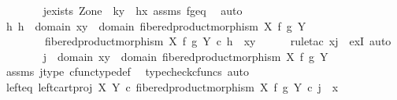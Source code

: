 \begin{isabellebody}
\ \ \ \ \ \ \isamarkupfalse%
\ j{\isacharunderscore}{\kern0pt}exists{\isacharbrackleft}{\kern0pt}\ Z{\isacharequal}{\kern0pt}one{\isacharcomma}{\kern0pt}\ \ k{\isacharequal}{\kern0pt}y{\isacharcomma}{\kern0pt}\ \ h{\isacharequal}{\kern0pt}x{\isacharbrackright}{\kern0pt}\ assms\ f{\isacharunderscore}{\kern0pt}g{\isacharunderscore}{\kern0pt}eq\ \isamarkupfalse%
\ auto\isanewline
\ \ \ \ \isamarkupfalse%
\ {\isachardoublequoteopen}{\isasymexists}h{\isachardot}{\kern0pt}\ h\ {\isacharcolon}{\kern0pt}\ domain\ {\isasymlangle}x{\isacharcomma}{\kern0pt}y{\isasymrangle}\ {\isasymrightarrow}\ domain\ {\isacharparenleft}{\kern0pt}fibered{\isacharunderscore}{\kern0pt}product{\isacharunderscore}{\kern0pt}morphism\ X\ f\ g\ Y{\isacharparenright}{\kern0pt}\ {\isasymand}\isanewline
\ \ \ \ \ \ \ \ fibered{\isacharunderscore}{\kern0pt}product{\isacharunderscore}{\kern0pt}morphism\ X\ f\ g\ Y\ {\isasymcirc}\isactrlsub c\ h\ {\isacharequal}{\kern0pt}\ {\isasymlangle}x{\isacharcomma}{\kern0pt}y{\isasymrangle}{\isachardoublequoteclose}\isanewline
\ \ \ \ \isamarkupfalse%
\ {\isacharparenleft}{\kern0pt}rule{\isacharunderscore}{\kern0pt}tac\ x{\isacharequal}{\kern0pt}j\ \ exI{\isacharcomma}{\kern0pt}\ auto{\isacharparenright}{\kern0pt}\isanewline
\ \ \ \ \ \ \isamarkupfalse%
\ {\isachardoublequoteopen}j\ {\isacharcolon}{\kern0pt}\ domain\ {\isasymlangle}x{\isacharcomma}{\kern0pt}y{\isasymrangle}\ {\isasymrightarrow}\ domain\ {\isacharparenleft}{\kern0pt}fibered{\isacharunderscore}{\kern0pt}product{\isacharunderscore}{\kern0pt}morphism\ X\ f\ g\ Y{\isacharparenright}{\kern0pt}{\isachardoublequoteclose}\isanewline
\ \ \ \ \ \ \ \ \isamarkupfalse%
\ assms\ j{\isacharunderscore}{\kern0pt}type\ cfunc{\isacharunderscore}{\kern0pt}type{\isacharunderscore}{\kern0pt}def\ \isamarkupfalse%
\ {\isacharparenleft}{\kern0pt}typecheck{\isacharunderscore}{\kern0pt}cfuncs{\isacharcomma}{\kern0pt}\ auto{\isacharparenright}{\kern0pt}\isanewline
\isanewline
\ \ \ \ \ \ \isamarkupfalse%
\ left{\isacharunderscore}{\kern0pt}eq{\isacharcolon}{\kern0pt}\ {\isachardoublequoteopen}left{\isacharunderscore}{\kern0pt}cart{\isacharunderscore}{\kern0pt}proj\ X\ Y\ {\isasymcirc}\isactrlsub c\ fibered{\isacharunderscore}{\kern0pt}product{\isacharunderscore}{\kern0pt}morphism\ X\ f\ g\ Y\ {\isasymcirc}\isactrlsub c\ j\ {\isacharequal}{\kern0pt}\ x{\isachardoublequoteclose}\isanewline
\ \ \ \ \ \ \ \ \isamarkupfalse%

\end{isabellebody}
